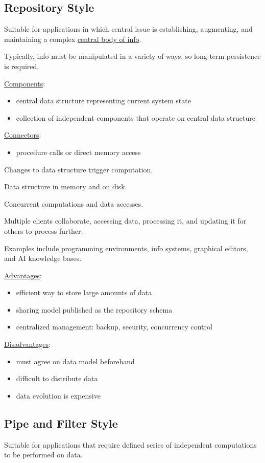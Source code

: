 \documentclass[11pt]{article}
\begin{document}
\subsection{Repository Style}
\label{sec:org80b6ca7}
Suitable for applications in which central issue is establishing, augmenting, and maintaining a
complex \uline{central body of info}.

Typically, info must be manipulated in a variety of ways, so long-term persistence is required.

\uline{Components}:
\begin{itemize}
\item central data structure representing current system state
\item collection of independent components that operate on central data structure
\end{itemize}

\uline{Connectors}:
\begin{itemize}
\item procedure calls or direct memory access
\end{itemize}

Changes to data structure trigger computation.

Data structure in memory and on disk.

Concurrent computations and data accesses.

Multiple clients collaborate, accessing data, processing it, and updating it for others to process
further.

Examples include programming environments, info systems, graphical editors, and AI knowledge
bases.

\uline{Advantages}:
\begin{itemize}
\item efficient way to store large amounts of data
\item sharing model published as the repository schema
\item centralized management: backup, security, concurrency control
\end{itemize}

\uline{Disadvantages}:
\begin{itemize}
\item must agree on data model beforehand
\item difficult to distribute data
\item data evolution is expensive
\end{itemize}
\subsection{Pipe and Filter Style}
\label{sec:org3b943f8}
Suitable for applications that require defined series of independent computations to be performed on
data.
\end{document}
